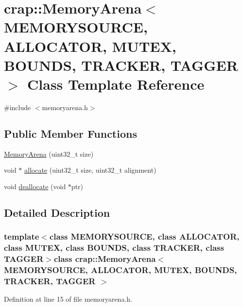 \hypertarget{classcrap_1_1_memory_arena}{}\section{crap\+:\+:Memory\+Arena$<$ M\+E\+M\+O\+R\+Y\+S\+O\+U\+R\+C\+E, A\+L\+L\+O\+C\+A\+T\+O\+R, M\+U\+T\+E\+X, B\+O\+U\+N\+D\+S, T\+R\+A\+C\+K\+E\+R, T\+A\+G\+G\+E\+R $>$ Class Template Reference}
\label{classcrap_1_1_memory_arena}


{\ttfamily \#include $<$memoryarena.\+h$>$}

\subsection*{Public Member Functions}
\begin{DoxyCompactItemize}
\item 
\hyperlink{classcrap_1_1_memory_arena_aac47e99b138e62497fb2f9c7db776214}{Memory\+Arena} (uint32\+\_\+t size)
\item 
void $\ast$ \hyperlink{classcrap_1_1_memory_arena_ab0b57539e9f0be9d579c04276ad7e201}{allocate} (uint32\+\_\+t size, uint32\+\_\+t alignment)
\item 
void \hyperlink{classcrap_1_1_memory_arena_aaae73e3840335dc8ac87f3185d7805a8}{deallocate} (void $\ast$ptr)
\end{DoxyCompactItemize}


\subsection{Detailed Description}
\subsubsection*{template$<$class M\+E\+M\+O\+R\+Y\+S\+O\+U\+R\+C\+E, class A\+L\+L\+O\+C\+A\+T\+O\+R, class M\+U\+T\+E\+X, class B\+O\+U\+N\+D\+S, class T\+R\+A\+C\+K\+E\+R, class T\+A\+G\+G\+E\+R$>$class crap\+::\+Memory\+Arena$<$ M\+E\+M\+O\+R\+Y\+S\+O\+U\+R\+C\+E, A\+L\+L\+O\+C\+A\+T\+O\+R, M\+U\+T\+E\+X, B\+O\+U\+N\+D\+S, T\+R\+A\+C\+K\+E\+R, T\+A\+G\+G\+E\+R $>$}



Definition at line 15 of file memoryarena.\+h.



